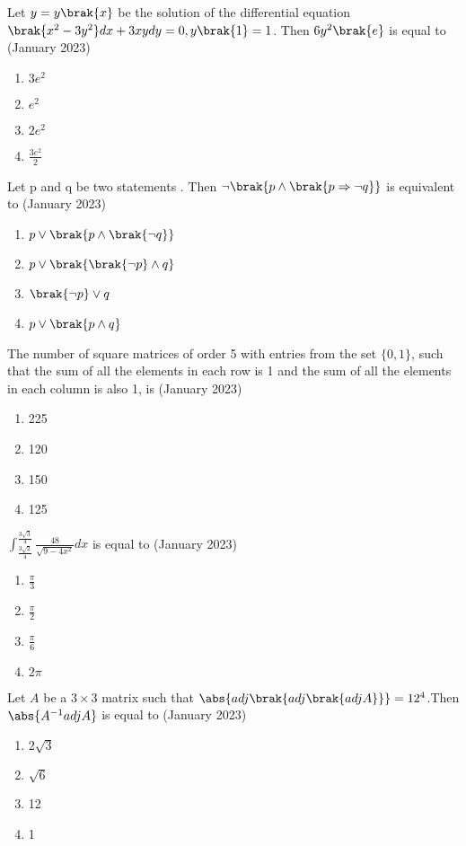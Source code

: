 \iffalse
\title{01-24-2023-shift-2-16-30}
\author{AI24BTECH11011}
\section{mcq-single}
\fi

\item Let $y = y\brak{x}$ be the solution of the differential
equation $\brak{x^2-3y^2}dx + 3xy dy = 0, y\brak{1} = 1$. Then
$6y^2\brak{e}$ is equal to
	\hfill{(January 2023)}
	\begin{enumerate}
    \item $3e^2$
    \item $e^2$
    \item $2e^2$
    \item $\frac{3e^2}{2}$
\end{enumerate}
\item Let p and q be two statements . Then $\neg \brak{p \land \brak{p \Rightarrow \neg q}}$ is equivalent to
\hfill{(January 2023)}
\begin{enumerate}
    \item $p \lor \brak{p \land \brak{\neg q}}$
    \item $p \lor \brak{\brak{\neg p} \land q}$
    \item $\brak{\neg p} \lor q$
    \item $p \lor \brak{p \land q}$
\end{enumerate}
\item The number of square matrices of order 5 with
entries from the set $\{0, 1\}$, such that the sum of all
the elements in each row is 1 and the sum of all the
elements in each column is also 1, is
\hfill{(January 2023)}
\begin{enumerate}
    \item 225
    \item 120
    \item 150
    \item 125
\end{enumerate}
\item $\int_{\frac{3\sqrt{2}}{4}}^{\frac{3\sqrt{3}}{4}}\frac{48}{\sqrt{9-4x^2}}dx$ is equal to
\hfill{(January 2023)}
\begin{enumerate}
    \item $\frac{\pi}{3}$
    \item $\frac{\pi}{2}$
    \item $\frac{\pi}{6}$
    \item $2\pi$
\end{enumerate}
\item Let $A$ be a $3 \times 3$ matrix such that $\abs{adj\brak{adj\brak{adjA}}}=12^4$.Then $\abs{A^{-1}adjA}$ is equal to 
\hfill{(January 2023)}
\begin{enumerate}
    \item $2\sqrt{3}$
    \item $\sqrt{6}$
    \item 12
    \item 1
\end{enumerate}
